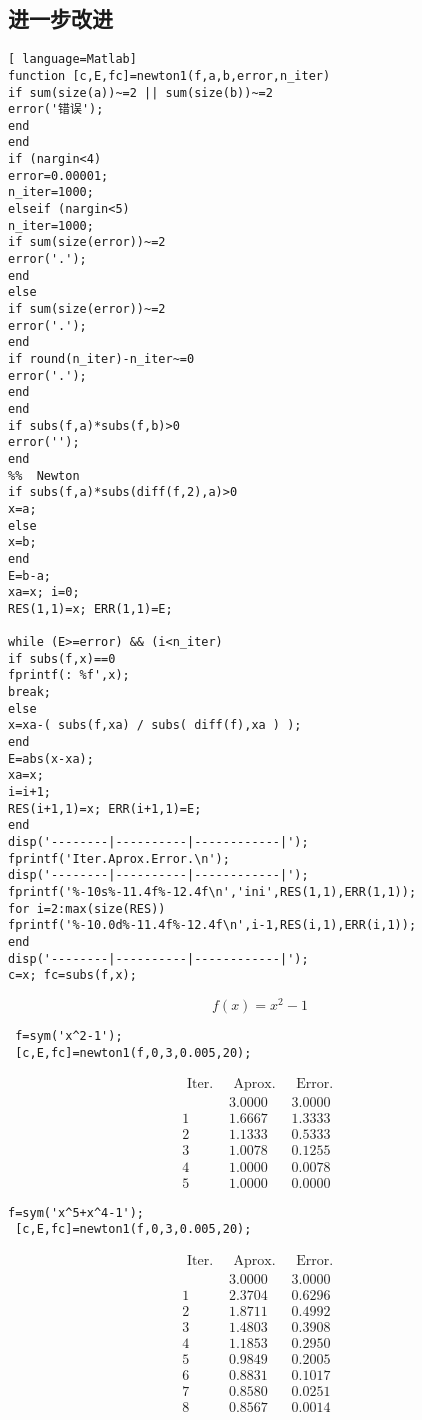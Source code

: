 \documentclass[cn,11pt,chinese,black]{elegantbook}
\begin{document}
\subsection{进一步改进}
\begin{lstlisting}[ language=Matlab] 
function [c,E,fc]=newton1(f,a,b,error,n_iter)
if sum(size(a))~=2 || sum(size(b))~=2
error('错误'); 
end  
end
if (nargin<4) 
error=0.00001;
n_iter=1000;
elseif (nargin<5) 
n_iter=1000;
if sum(size(error))~=2
error('.'); 
end
else
if sum(size(error))~=2
error('.'); 
end
if round(n_iter)-n_iter~=0
error('.');
end
end
if subs(f,a)*subs(f,b)>0
error('');
end
%%  Newton
if subs(f,a)*subs(diff(f,2),a)>0
x=a; 
else
x=b; 
end
E=b-a;
xa=x; i=0;
RES(1,1)=x; ERR(1,1)=E;

while (E>=error) && (i<n_iter)
if subs(f,x)==0
fprintf(: %f',x);
break;
else
x=xa-( subs(f,xa) / subs( diff(f),xa ) );
end
E=abs(x-xa);
xa=x;
i=i+1;
RES(i+1,1)=x; ERR(i+1,1)=E;
end
disp('--------|----------|------------|');
fprintf('Iter.Aprox.Error.\n');
disp('--------|----------|------------|');
fprintf('%-10s%-11.4f%-12.4f\n','ini',RES(1,1),ERR(1,1));
for i=2:max(size(RES))
fprintf('%-10.0d%-11.4f%-12.4f\n',i-1,RES(i,1),ERR(i,1));
end
disp('--------|----------|------------|');
c=x; fc=subs(f,x);
\end{lstlisting}
$$f(x)=x^2-1$$
\begin{lstlisting}
 f=sym('x^2-1');
 [c,E,fc]=newton1(f,0,3,0.005,20);
\end{lstlisting}
$$\begin{array}{lll}
\text { Iter. } & \text { Aprox. } & \text { Error. } \\
\text {  } & 3.0000 & 3.0000 \\
1 & 1.6667 & 1.3333 \\
2 & 1.1333 & 0.5333 \\
3 & 1.0078 & 0.1255 \\
4 & 1.0000 & 0.0078 \\
5 & 1.0000 & 0.0000
\end{array}$$
\begin{lstlisting}
f=sym('x^5+x^4-1');
 [c,E,fc]=newton1(f,0,3,0.005,20);
\end{lstlisting}
$$\begin{array}{lll}
\text { Iter. } & \text { Aprox. } & \text { Error. } \\
\text {  } & 3.0000 & 3.0000 \\
1 & 2.3704 & 0.6296 \\
2 & 1.8711 & 0.4992 \\
3 & 1.4803 & 0.3908 \\
4 & 1.1853 & 0.2950 \\
5 & 0.9849 & 0.2005 \\
6 & 0.8831 & 0.1017 \\
7 & 0.8580 & 0.0251 \\
8 & 0.8567 & 0.0014
\end{array}$$
\end{document}
